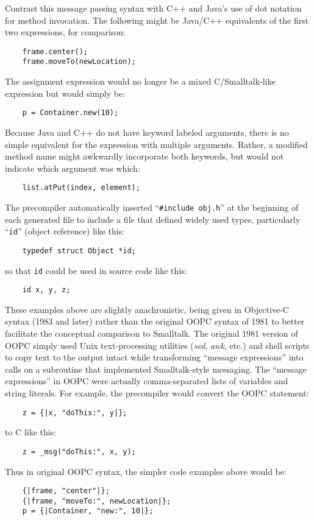 \documentclass[acmsmall,screen]{acmart}
\begin{document}
Contrast this message passing syntax with C++ and Java's use of dot notation for method invocation. The following might be Java/C++ equivalents of the first two expressions, for comparison:
\begin{verbatim}
    frame.center();
    frame.moveTo(newLocation);
\end{verbatim}
The assignment expression would no longer be a mixed C/Smalltalk-like expression but would simply be:
\begin{verbatim}
    p = Container.new(10);
\end{verbatim}
Because Java and C++ do not have keyword labeled arguments, there is no simple equivalent for the expression with multiple arguments. Rather, a modified method name might awkwardly incorporate both keywords, but would not indicate which argument was which:
\begin{verbatim}
    list.atPut(index, element);
\end{verbatim}
The precompiler automatically inserted ``{\small \verb|#include obj.h|}'' at the beginning of each generated file to include a file that defined widely used types, particularly ``\verb$id$'' (object reference) like this:
\begin{verbatim}
    typedef struct Object *id;
\end{verbatim}
so that \verb$id$ could be used in source code like this:
\begin{verbatim}
    id x, y, z;
\end{verbatim}
These examples above are slightly anachronistic, being given in Objective-C syntax (1983 and later) rather than the original OOPC syntax of 1981 to better facilitate the conceptual comparison to Smalltalk.
The original 1981 version of OOPC simply used Unix text-processing utilities (\textit{sed}, \textit{awk}, etc.) and shell scripts to copy text to the output intact while transforming ``message expressions'' into calls on a subroutine that implemented Smalltalk-style messaging. The ``message expressions'' in OOPC were actually comma-separated lists of variables and string literals. For example, the precompiler would convert the OOPC statement:
\begin{verbatim}
    z = {|x, "doThis:", y|};
\end{verbatim}
to C like this:
\begin{verbatim}
    z = _msg("doThis:", x, y);
\end{verbatim}
Thus in original OOPC syntax, the simpler code examples above would be:
\begin{verbatim}
    {|frame, "center"|};
    {|frame, "moveTo:", newLocation|};
    p = {|Container, "new:", 10|};
\end{verbatim}
\end{document}
